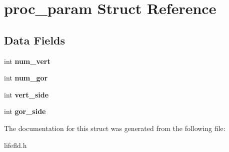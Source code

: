 \hypertarget{structproc__param}{}\section{proc\+\_\+param Struct Reference}
\label{structproc__param}
\subsection*{Data Fields}
\begin{DoxyCompactItemize}
\item 
\hypertarget{structproc__param_a9072610d26440867757053b0511091df}{}int {\bfseries num\+\_\+vert}\label{structproc__param_a9072610d26440867757053b0511091df}

\item 
\hypertarget{structproc__param_ab98bd982bcef064d742eaad7405b75fa}{}int {\bfseries num\+\_\+gor}\label{structproc__param_ab98bd982bcef064d742eaad7405b75fa}

\item 
\hypertarget{structproc__param_aa451c5f2cadd3053a3fb92db509345d2}{}int {\bfseries vert\+\_\+side}\label{structproc__param_aa451c5f2cadd3053a3fb92db509345d2}

\item 
\hypertarget{structproc__param_aa38bc3a4369ecb19504a1bbeb65c0fd7}{}int {\bfseries gor\+\_\+side}\label{structproc__param_aa38bc3a4369ecb19504a1bbeb65c0fd7}

\end{DoxyCompactItemize}


The documentation for this struct was generated from the following file\+:\begin{DoxyCompactItemize}
\item 
lifefld.\+h\end{DoxyCompactItemize}
